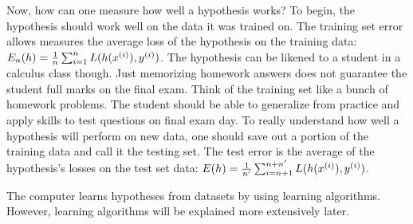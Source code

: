 \documentclass{article}
\begin{document}
Now, how can one measure how well a hypothesis works? To begin, the hypothesis should work well on the data it was trained on. The training set error allows measures the average loss of the hypothesis on the training data: $E_n(h) = {1\over{n}}\sum^{n}_{i=1}{L(h(x^{(i)}),y^{(i)})}$. The hypothesis can be likened to a student in a calculus class though. Just memorizing homework answers does not guarantee the student full marks on the final exam. Think of the training set like a bunch of homework problems. The student should be able to generalize from practice and apply skills to test questions on final exam day. To really understand how well a hypothesis will perform on new data, one should save out a portion of the training data and call it the testing set. The test error is the average of the hypothesis's losses on the test set data: $E(h) = {1\over{n'}}\sum^{n+n'}_{i=n+1}L(h(x^{(i)}),y^{(i)})$.

The computer learns hypotheses from datasets by using learning algorithms. However, learning algorithms will be explained more extensively later. 


 
\end{document}

